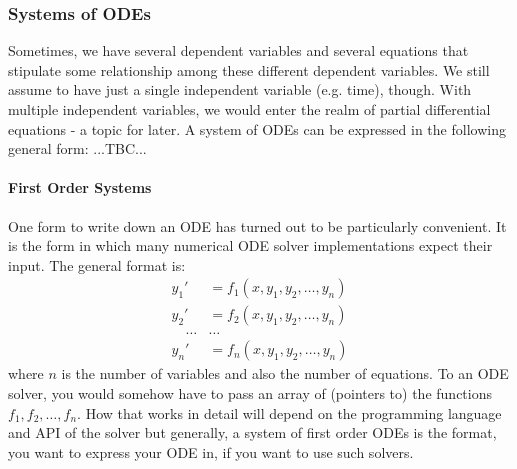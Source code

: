 \subsubsection{Systems of ODEs}
Sometimes, we have several dependent variables and several equations that stipulate some relationship among these different dependent variables. We still assume to have just a single independent variable (e.g. time), though. With multiple independent variables, we would enter the realm of partial differential equations - a topic for later. A system of ODEs can be expressed in the following general form: ...TBC...


\paragraph{First Order Systems}
One form to write down an ODE has turned out to be particularly convenient. It is the form in which many numerical ODE solver implementations expect their input. The general format is:
\begin{eqnarray}
 y_1' &= f_1(x, y_1, y_2, \ldots, y_n) \\
 y_2' &= f_2(x, y_1, y_2, \ldots, y_n) \\
 \quad \ldots & \ldots \\
 y_n' &= f_n(x, y_1, y_2, \ldots, y_n)
\end{eqnarray}
where $n$ is the number of variables and also the number of equations. To an ODE solver, you would somehow have to pass an array of (pointers to) the functions $f_1, f_2, \ldots, f_n$. How that works in detail will depend on the programming language and API of the solver but generally, a system of first order ODEs is the format, you want to express your ODE in, if you want to use such solvers.


